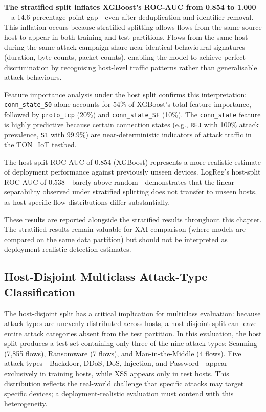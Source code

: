 \documentclass[12pt,a4paper]{report}
\begin{document}
\textbf{The stratified split inflates XGBoost's ROC-AUC from 0.854 to 1.000}---a 14.6 percentage point gap---even after deduplication and identifier removal. This inflation occurs because stratified splitting allows flows from the same source host to appear in both training and test partitions. Flows from the same host during the same attack campaign share near-identical behavioural signatures (duration, byte counts, packet counts), enabling the model to achieve perfect discrimination by recognising host-level traffic patterns rather than generalisable attack behaviours.

Feature importance analysis under the host split confirms this interpretation: \texttt{conn\_state\_S0} alone accounts for 54\% of XGBoost's total feature importance, followed by \texttt{proto\_tcp} (20\%) and \texttt{conn\_state\_SF} (10\%). The \texttt{conn\_state} feature is highly predictive because certain connection states (e.g., \texttt{REJ} with 100\% attack prevalence, \texttt{S1} with 99.9\%) are near-deterministic indicators of attack traffic in the TON\_IoT testbed.

The host-split ROC-AUC of 0.854 (XGBoost) represents a more realistic estimate of deployment performance against previously unseen devices. LogReg's host-split ROC-AUC of 0.538---barely above random---demonstrates that the linear separability observed under stratified splitting does not transfer to unseen hosts, as host-specific flow distributions differ substantially.

These results are reported alongside the stratified results throughout this chapter. The stratified results remain valuable for XAI comparison (where models are compared on the same data partition) but should not be interpreted as deployment-realistic detection estimates.

\subsection{Host-Disjoint Multiclass Attack-Type Classification}
\label{sec:host-multiclass}

The host-disjoint split has a critical implication for multiclass evaluation: because attack types are unevenly distributed across hosts, a host-disjoint split can leave entire attack categories absent from the test partition. In this evaluation, the host split produces a test set containing only three of the nine attack types: Scanning (7,855 flows), Ransomware (7 flows), and Man-in-the-Middle (4 flows). Five attack types---Backdoor, DDoS, DoS, Injection, and Password---appear exclusively in training hosts, while XSS appears only in test hosts. This distribution reflects the real-world challenge that specific attacks may target specific devices; a deployment-realistic evaluation must contend with this heterogeneity.
\end{document}
